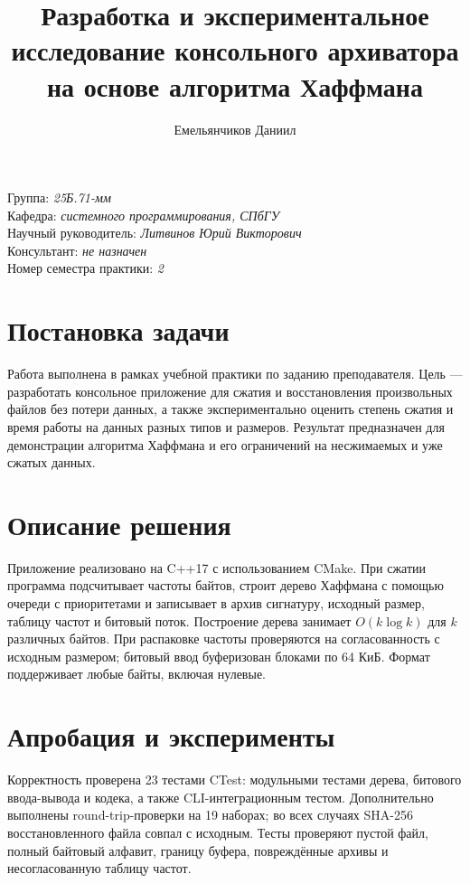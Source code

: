 \documentclass[a4paper]{article}
\title{Разработка и экспериментальное исследование консольного архиватора на основе алгоритма Хаффмана}
\author{Емельянчиков Даниил}
\date{}
\begin{document}
\maketitle

\begin{flushright}
    Группа: \emph{25Б.71-мм}\\
    Кафедра: \emph{системного программирования, СПбГУ}\\
    Научный руководитель: \emph{Литвинов Юрий Викторович}\\
    Консультант: \emph{не назначен}\\
    Номер семестра практики: \emph{2}
\end{flushright}

\section{Постановка задачи}
Работа выполнена в рамках учебной практики по заданию преподавателя. Цель --- разработать консольное приложение для сжатия и восстановления произвольных файлов без потери данных, а также экспериментально оценить степень сжатия и время работы на данных разных типов и размеров. Результат предназначен для демонстрации алгоритма Хаффмана и его ограничений на несжимаемых и уже сжатых данных.

\section{Описание решения}
Приложение реализовано на C++17 с использованием CMake. При сжатии программа подсчитывает частоты байтов, строит дерево Хаффмана с помощью очереди с приоритетами и записывает в архив сигнатуру, исходный размер, таблицу частот и битовый поток. Построение дерева занимает $O(k\log k)$ для $k$ различных байтов. При распаковке частоты проверяются на согласованность с исходным размером; битовый ввод буферизован блоками по 64 КиБ. Формат поддерживает любые байты, включая нулевые.

\section{Апробация и эксперименты}
Корректность проверена 23 тестами CTest: модульными тестами дерева, битового ввода-вывода и кодека, а также CLI-интеграционным тестом. Дополнительно выполнены round-trip-проверки на 19 наборах; во всех случаях SHA-256 восстановленного файла совпал с исходным. Тесты проверяют пустой файл, полный байтовый алфавит, границу буфера, повреждённые архивы и несогласованную таблицу частот.
\end{document}
